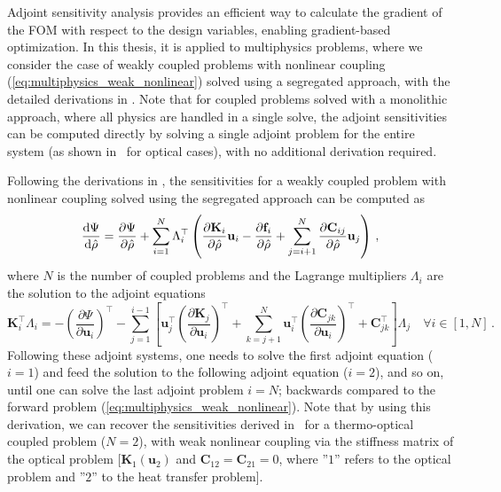     Adjoint sensitivity analysis provides an efficient way to calculate the gradient of the FOM with respect to the design variables,
 enabling gradient-based optimization. In this thesis, it is applied to multiphysics problems,
 where we consider the case of weakly coupled problems with
 nonlinear coupling (\eqref{eq:multiphysics_weak_nonlinear}) solved using a segregated approach, with the detailed derivations in 
    . Note that for coupled problems solved with a monolithic approach, where all physics are handled
 in a single solve, the adjoint sensitivities can be computed directly by solving a single adjoint problem for the entire
 system (as shown in~\cite{jensen_review} for optical cases), with no additional derivation required.

 Following the derivations in , the sensitivities for a weakly coupled problem with nonlinear coupling solved using the segregated
 approach can be computed as
    \begin{equation}
 \frac{\mathop{}\!\text{d} \Psi}{\mathop{}\!\text{d} \hat{\rho}}  = \frac{\partial \Psi}{\partial \hat{\rho}} + \sum^N_{i=1} \Lambda_{i}^{\top} \left( \frac{\partial \mathbf{K}_i}{\partial \hat{\rho}} \mathbf{u}_i - \frac{\partial \mathbf{f}_i}{\partial \hat{\rho}} + \sum^N_{j=i+1} \frac{\partial \mathbf{C}_{ij}}{\partial \hat{\rho}} \mathbf{u}_j \right)\,,
    \end{equation}
 where $N$ is the number of coupled problems and the Lagrange multipliers $\Lambda_i$ are the solution to the adjoint equations
    \begin{equation}\label{eq:adjoint_eqs}
        \mathbf{K}^\top_i \Lambda_i = -\left(\frac{\partial \Psi}{\partial \mathbf{u}_i}\right)^\top - \sum_{j=1}^{i-1} \left[ 
            \mathbf{u}^\top_j \left(\frac{\partial \mathbf{K}_j}{\partial \mathbf{u}_i}\right)^\top  + \sum^N_{k=j+1} \mathbf{u}^\top_i \left(\frac{\partial \mathbf{C}_{jk}}{\partial \mathbf{u}_i}\right)^\top + \mathbf{C}^\top_{jk} \right]\Lambda_j  \quad \forall i \in [1, N] \,.
   \end{equation}
 Following these adjoint systems, one needs to solve the first adjoint equation ($i=1$) 
 and feed the solution to the following adjoint equation ($i=2$), and so on, until one can solve the last adjoint problem $i=N$; backwards compared to the forward problem (\eqref{eq:multiphysics_weak_nonlinear}).
 Note that by using this derivation, we can recover the sensitivities derived in~\cite{ownpub0} for a thermo-optical coupled problem ($N=2$), with weak nonlinear coupling
 via the stiffness matrix of the optical problem [$\mathbf{K}_1(\mathbf{u}_2)$ and $\mathbf{C}_{12}=\mathbf{C}_{21}=0$, where ''$1$'' refers to the optical problem and ''$2$'' to the 
 heat transfer problem].
    
